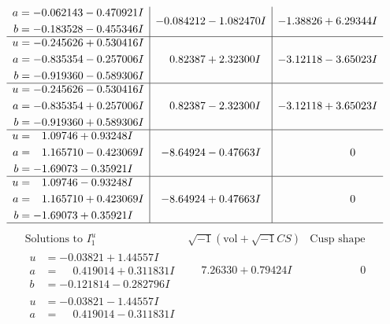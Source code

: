 \documentclass[1p]{elsarticle_modified}
\theoremstyle{definition}
\newcommand{\I}{\sqrt{-1}}
\begin{document}
$$\begin{array}{c|c|c}
\begin{aligned}
a &= -0.062143 - 0.470921 I \\
b &= -0.183528 - 0.455346 I\end{aligned}
 & -0.084212 - 1.082470 I & -1.38826 + 6.29344 I \\ \hline\begin{aligned}
u &= -0.245626 + 0.530416 I \\
a &= -0.835354 - 0.257006 I \\
b &= -0.919360 - 0.589306 I\end{aligned}
 & \phantom{-}0.82387 + 2.32300 I & -3.12118 - 3.65023 I \\ \hline\begin{aligned}
u &= -0.245626 - 0.530416 I \\
a &= -0.835354 + 0.257006 I \\
b &= -0.919360 + 0.589306 I\end{aligned}
 & \phantom{-}0.82387 - 2.32300 I & -3.12118 + 3.65023 I \\ \hline\begin{aligned}
u &= \phantom{-}1.09746 + 0.93248 I \\
a &= \phantom{-}1.165710 - 0.423069 I \\
b &= -1.69073 - 0.35921 I\end{aligned}
 & -8.64924 - 0.47663 I & \phantom{-0.000000 } 0 \\ \hline\begin{aligned}
u &= \phantom{-}1.09746 - 0.93248 I \\
a &= \phantom{-}1.165710 + 0.423069 I \\
b &= -1.69073 + 0.35921 I\end{aligned}
 & -8.64924 + 0.47663 I & \phantom{-0.000000 } 0\\
 \hline 
 \end{array}$$\newpage$$\begin{array}{c|c|c}  
\text{Solutions to }I^u_{1}& \I (\text{vol} + \sqrt{-1}CS) & \text{Cusp shape}\\
 \hline 
\begin{aligned}
u &= -0.03821 + 1.44557 I \\
a &= \phantom{-}0.419014 + 0.311831 I \\
b &= -0.121814 - 0.282796 I\end{aligned}
 & \phantom{-}7.26330 + 0.79424 I & \phantom{-0.000000 } 0 \\ \hline\begin{aligned}
u &= -0.03821 - 1.44557 I \\
a &= \phantom{-}0.419014 - 0.311831 I \\

\end{aligned}
\end{array}$$
\end{document}
